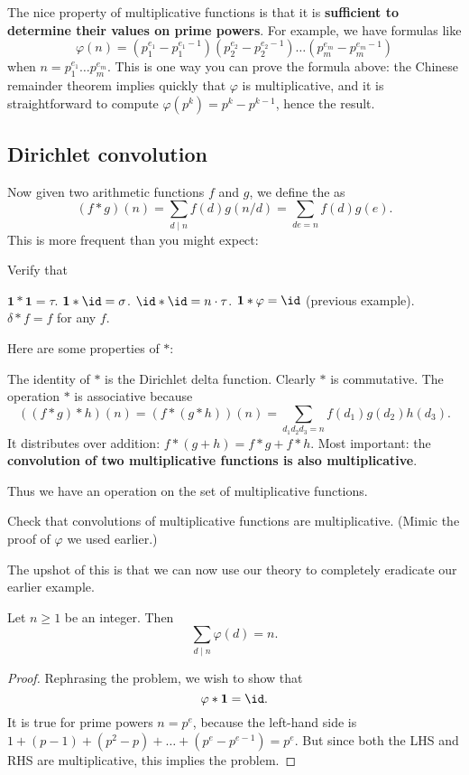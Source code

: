 \documentclass[11pt]{scrartcl}
\begin{document}
The nice property of multiplicative functions is that
it is \textbf{sufficient to determine their values on prime powers}.
For example, we have formulas like
\[
  \varphi(n)
  =
  \left( p_1^{e_1} - p_1^{e_1-1} \right)
  \left( p_2^{e_2} - p_2^{e_2-1} \right)
  \dots
  \left( p_m^{e_m} - p_m^{e_m-1} \right)
\]
when $n = p_1^{e_1} \dots p_m^{e_m}$.
This is one way you can prove the formula above:
the Chinese remainder theorem implies quickly that $\varphi$ is multiplicative,
and it is straightforward to compute $\varphi(p^k) = p^k - p^{k-1}$,
hence the result.

\subsection{Dirichlet convolution}
Now given two arithmetic functions $f$ and $g$, we define
the  as
\[ (f \ast g)(n) = \sum_{d \mid n} f(d) g(n/d)
  = \sum_{de = n} f(d) g(e). \]
This is more frequent than you might expect:
\begin{example}
  Verify that
  \begin{itemize}
    \ii $\mathbf 1 \ast \mathbf 1 = \tau$.
    \ii $\mathbf 1 \ast \id = \sigma$.
    \ii $\id \ast \id = n \cdot \tau$.
    \ii $\mathbf 1 \ast \varphi = \id$ (previous example).
    \ii $\delta \ast f = f$ for any $f$.
  \end{itemize}
\end{example}

Here are some properties of $\ast$:
\begin{itemize}
  \ii The identity of $\ast$ is the Dirichlet delta function.
  \ii Clearly $\ast$ is commutative.
  \ii The operation $\ast$ is associative because
  \[
  \left( (f \ast g) \ast h \right)(n)
  = \left( f \ast (g \ast h) \right)(n)
  = \sum_{d_1d_2d_3 = n} f(d_1) g(d_2) h(d_3).
  \]
  \ii It distributes over addition: $f \ast (g+h) = f \ast g + f \ast h$.
  \ii Most important: the \textbf{convolution of two
    multiplicative functions is also multiplicative}.
\end{itemize}
Thus we have an operation on the set of multiplicative functions.
\begin{exercise}
  Check that convolutions of multiplicative functions are multiplicative.
  (Mimic the proof of $\varphi$ we used earlier.)
\end{exercise}

The upshot of this is that we can now use our theory to completely
eradicate our earlier example.
\begin{example}
  [$\varphi \ast \mathbf 1 = \id$]
  Let $n \ge 1$ be an integer. Then
  \[ \sum_{d \mid n} \varphi(d) = n. \]
\end{example}
\begin{proof}
  Rephrasing the problem, we wish to show that
  \[ \varphi \ast \mathbf 1 = \id. \]
  It is true for prime powers $n = p^e$, because the left-hand side is
  $1 + (p-1) + (p^2-p) + \dots + (p^e-p^{e-1}) = p^e$.
  But since both the LHS and RHS are multiplicative, this implies the problem.
\end{proof}
\end{document}
